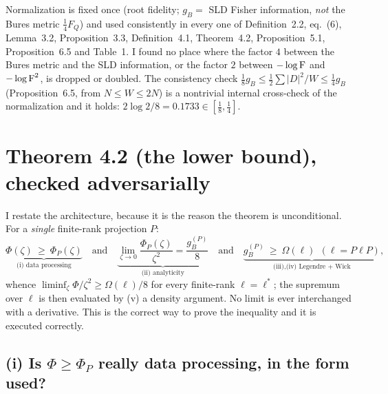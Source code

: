\documentclass[11pt]{article}
\newcommand{\abs}[1]{\left|#1\right|}
\theoremstyle{definition}\newtheorem{problem}[theorem]{Problem}
\begin{document}
\begin{verdictok}
Normalization is fixed once (root fidelity; \(g_B=\) SLD Fisher information, \emph{not} the Bures
metric \(\frac14F_Q\)) and used consistently in every one of Definition~2.2, eq.~(6),
Lemma~3.2, Proposition~3.3, Definition~4.1, Theorem~4.2, Proposition~5.1, Proposition~6.5 and
Table~1.  I found no place where the factor \(4\) between the Bures metric and the SLD information,
or the factor \(2\) between \(-\log\operatorname{F}\) and \(-\log\operatorname{F}^2\), is dropped or doubled.  The
consistency check \(\frac18g_B\le\frac12\sum\abs{D}^2/W\le\frac14g_B\) (Proposition~6.5, from
\(N\le W\le2N\)) is a nontrivial internal cross-check of the normalization and it holds:
\(2\log2/8=0.1733\in[\frac18,\frac14]\).
\end{verdictok}

\section{Theorem 4.2 (the lower bound), checked adversarially}\label{sec:thm42}

I restate the architecture, because it is the reason the theorem is unconditional.  For a
\emph{single} finite-rank projection \(P\):
\[
 \underbrace{\Phi(\zeta)\ \ge\ \Phi_P(\zeta)}_{\text{(i) data processing}}
 \quad\text{and}\quad
 \underbrace{\lim_{\zeta\to0}\frac{\Phi_P(\zeta)}{\zeta^2}=\frac{g_B^{(P)}}8}_{\text{(ii) analyticity}}
 \quad\text{and}\quad
 \underbrace{g_B^{(P)}\ \ge\ \Omega(\ell)\ \ (\ell=P\ell P)}_{\text{(iii),(iv) Legendre + Wick}},
\]
whence \(\liminf_\zeta\Phi/\zeta^2\ge\Omega(\ell)/8\) for every finite-rank \(\ell=\ell^*\); the
supremum over \(\ell\) is then evaluated by (v) a density argument.  No limit is ever interchanged
with a derivative.  This is the correct way to prove the inequality and it is executed correctly.

\subsection{(i) Is \(\Phi\ge\Phi_P\) really data processing, in the form used?}
\end{document}
